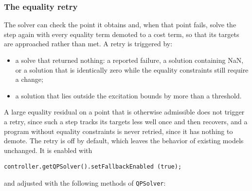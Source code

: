 \subsubsection{The equality retry}

The solver can check the point it obtains and, when that point fails, solve
the step again with every equality term demoted to a cost term, so that its
targets are approached rather than met. A retry is triggered by:
%
\begin{itemize}

\item a solve that returned nothing: a reported failure, a solution
containing NaN, or a solution that is identically zero while the equality
constraints still require a change;

\item a solution that lies outside the excitation bounds by more than a
threshold.

\end{itemize}
%
A large equality residual on a point that is otherwise admissible does not
trigger a retry, since such a step tracks its targets less well once and
then recovers, and a program without equality constraints is never retried,
since it has nothing to demote. The retry is off by default, which leaves the
behavior of existing models unchanged. It is enabled with
%
\begin{lstlisting}[]
   controller.getQPSolver().setFallbackEnabled (true);
\end{lstlisting}
%
and adjusted with the following methods of {\tt QPSolver}:

